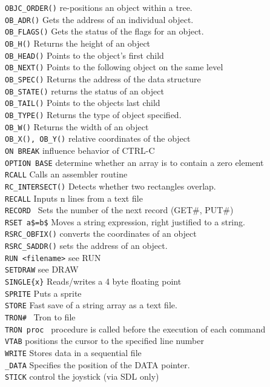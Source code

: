 \begin{tabbing}
\verb|OBJC_ORDER()|\>	      re-positions an object within a tree.\\
\verb|OB_ADR()|\>	      Gets the address of an individual object.\\
\verb|OB_FLAGS()|\>	      Gets the status of the flags for an object.\\
\verb|OB_H()|\> 	      Returns the height of an object\\
\verb|OB_HEAD()|\>	      Points to the object's first child\\
\verb|OB_NEXT()|\>	      Points to the following object on the same level\\
\verb|OB_SPEC()|\>	      Returns the address of the data structure\\
\verb|OB_STATE()|\>	      returns the status of an object\\
\verb|OB_TAIL()|\>	      Points to the objects last child\\
\verb|OB_TYPE()|\>	      Returns the type of object specified.\\
\verb|OB_W()|\> 	      Returns the width of an object\\
\verb|OB_X(), OB_Y()|\>       relative  coordinates  of  the   object\\
\verb|ON BREAK|\>	      influence behavior of CTRL-C\\
\verb|OPTION BASE|\>	      determine whether an  array  is  to contain a zero element\\
\verb|RCALL|\>        Calls  an assembler routine\\
\verb|RC_INTERSECT()|\>  Detects whether two rectangles overlap.\\
\verb|RECALL|\>       Inputs n lines from a text file\\
\verb|RECORD |\>	      Sets the number of the next record (GET\#, PUT\#)\\
\verb|RSET a$=b$|\>   Moves a string expression, right justified to a string.\\
\verb|RSRC_OBFIX()|\> converts the coordinates of an object\\
\verb|RSRC_SADDR()|\> sets the address of an object.\\
\verb|RUN <filename>|\>   see RUN\\
\verb|SETDRAW|\>      see DRAW\\
\verb|SINGLE{x}|\>    Reads/writes  a  4  byte floating point\\
\verb|SPRITE|\> 	      Puts a sprite\\
\verb|STORE|\>  	      Fast save of a string array as a text file.\\
\verb|TRON# |\> 	      Tron to file\\
\verb|TRON proc |\>    procedure is called  before  the execution of each command\\
\verb|VTAB|\>         positions the cursor to the specified line number\\
\verb|WRITE|\>  	      Stores data in a sequential file\\
\verb|_DATA|\>	       	Specifies the position of the DATA pointer.\\
\verb|STICK|\>		control the joystick (via SDL only)\\
\end{tabbing}

